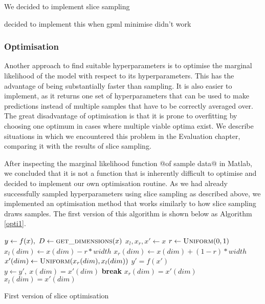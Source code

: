 \documentclass[a4paper,12pt,twoside,openright]{report}
\newcommand{\Break}{\State \textbf{break} }
\begin{document}
We decided to implement slice sampling

decided to implement this when gpml minimise didn't work







\subsubsection{Optimisation}
Another approach to find suitable hyperparameters is to optimise the marginal likelihood of the model with respect to its hyperparameters. This has the advantage of being substantially faster than sampling. It is also easier to implement, as it returns one set of hyperparameters that can be used to make predictions instead of multiple samples that have to be correctly averaged over. The great disadvantage of optimisation is that it is prone to overfitting by choosing one optimum in cases where multiple viable optima exist. We describe situations in which we encountered this problem in the Evaluation chapter, comparing it with the results of slice sampling.



After inspecting the marginal likelihood function @of sample data@ in Matlab, we concluded that it is not a function that is inherently difficult to optimise and decided to implement our own optimisation routine. As we had already successfully sampled hyperparameters using slice sampling as described above, we implemented an optimisation method that works similarly to how slice sampling draws samples. The first version of this algorithm is shown below as Algorithm \ref{opti1}.


\begin{algorithm}
\begin{algorithmic}[1]
\State $y\gets f(x),\ D\gets \Call{get\_dimensions}{x}$
\State $x_l, x_r, x'\gets x$
\State $r\gets \Call{Uniform}{0, 1}$
\State $x_l(dim)\gets x(dim) - r * width$
\State $x_r(dim)\gets x(dim) + (1 - r) * width$
\State $x'(dim)\gets \Call{Uniform}{x_r(dim), x_l(dim)}$
\State $y' = f(x')$
\State $y\gets y',\ x(dim) = x'(dim)$
\Break
\EndIf
{}
\State $x_r(dim) = x'(dim)$
\State $x_l(dim) = x'(dim)$
\EndIf
\EndFor
\EndFor
\EndFor
\EndProcedure
\end{algorithmic}
\caption{First version of slice optimisation}
\label{opti1}
\end{algorithm}
\end{document}
